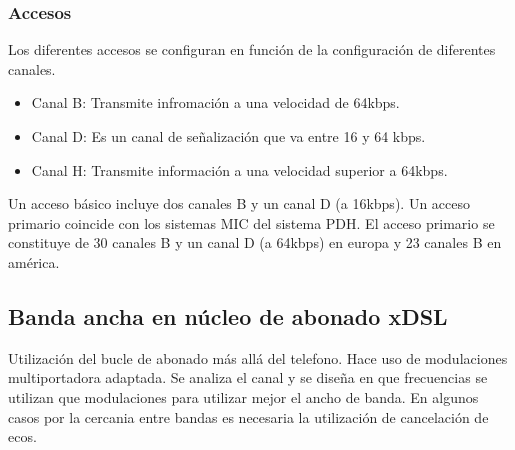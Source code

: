 \subsubsection{Accesos}
Los diferentes accesos se configuran en función de la configuración de diferentes canales.
\begin{itemize}
	\item Canal B: Transmite infromación a una velocidad de 64kbps.
	\item Canal D: Es un canal de señalización que va entre 16 y 64 kbps.
	\item Canal H: Transmite información a una velocidad superior a 64kbps.
\end{itemize}
Un acceso básico incluye dos canales B y un canal D (a 16kbps). Un acceso primario coincide con los sistemas MIC del sistema PDH. El acceso primario se constituye de 30 canales B y un canal D (a 64kbps) en europa y 23 canales B en américa.
\subsection{Banda ancha en núcleo de abonado xDSL}
Utilización del bucle de abonado más allá del telefono. Hace uso de modulaciones multiportadora adaptada. Se analiza el canal y se diseña en que frecuencias se utilizan que modulaciones para utilizar mejor el ancho de banda. En algunos casos por la cercania entre bandas es necesaria la utilización de cancelación de ecos.
